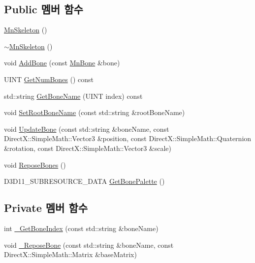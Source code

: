 \subsection*{Public 멤버 함수}
\begin{DoxyCompactItemize}
\item 
\hyperlink{class_m_n_l_1_1_mn_skeleton_adf1be48a501ebca36f4994a3c50c8084}{Mn\+Skeleton} ()
\item 
\hyperlink{class_m_n_l_1_1_mn_skeleton_a955aa6f82d0c872c3b62c01d1921dbc0}{$\sim$\+Mn\+Skeleton} ()
\item 
void \hyperlink{class_m_n_l_1_1_mn_skeleton_a21b331c44d2cc80bcc1401fa87cce13f}{Add\+Bone} (const \hyperlink{class_m_n_l_1_1_mn_bone}{Mn\+Bone} \&bone)
\item 
U\+I\+NT \hyperlink{class_m_n_l_1_1_mn_skeleton_a3aa0541c8b6ea0c1cd4a3fe68580e5c6}{Get\+Num\+Bones} () const
\item 
std\+::string \hyperlink{class_m_n_l_1_1_mn_skeleton_a1536e0bb8da6bdb03b6ce117fa995869}{Get\+Bone\+Name} (U\+I\+NT index) const
\item 
void \hyperlink{class_m_n_l_1_1_mn_skeleton_a3e82493cbe23cb9194e0386f63062a42}{Set\+Root\+Bone\+Name} (const std\+::string \&root\+Bone\+Name)
\item 
void \hyperlink{class_m_n_l_1_1_mn_skeleton_a7c3019ae3e241b3c6569fb4639b511b8}{Update\+Bone} (const std\+::string \&bone\+Name, const Direct\+X\+::\+Simple\+Math\+::\+Vector3 \&position, const Direct\+X\+::\+Simple\+Math\+::\+Quaternion \&rotation, const Direct\+X\+::\+Simple\+Math\+::\+Vector3 \&scale)
\item 
void \hyperlink{class_m_n_l_1_1_mn_skeleton_a58eeefaad4481a12c647ffcf8f8b6540}{Repose\+Bones} ()
\item 
D3\+D11\+\_\+\+S\+U\+B\+R\+E\+S\+O\+U\+R\+C\+E\+\_\+\+D\+A\+TA \hyperlink{class_m_n_l_1_1_mn_skeleton_ab1402fc56312ac3412ff7fc8093e9f2b}{Get\+Bone\+Palette} ()
\end{DoxyCompactItemize}
\subsection*{Private 멤버 함수}
\begin{DoxyCompactItemize}
\item 
int \hyperlink{class_m_n_l_1_1_mn_skeleton_acb6babb0a6d0c5fd190db635df196b30}{\+\_\+\+Get\+Bone\+Index} (const std\+::string \&bone\+Name)
\item 
void \hyperlink{class_m_n_l_1_1_mn_skeleton_a75808800a6739088b729a9f9112e3521}{\+\_\+\+Repose\+Bone} (const std\+::string \&bone\+Name, const Direct\+X\+::\+Simple\+Math\+::\+Matrix \&base\+Matrix)
\end{DoxyCompactItemize}
